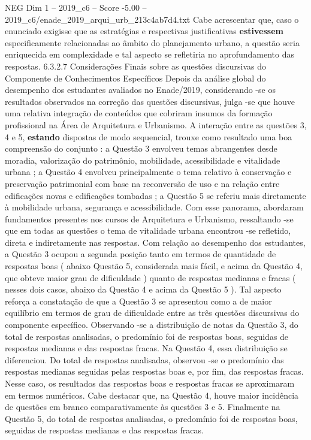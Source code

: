 \begin{textsample}{NEG Dim 1 – 2019\_c6 – Score -5.00 – 2019\_c6/enade\_2019\_arqui\_urb\_213c4ab7d4.txt}
Cabe acrescentar que, caso o enunciado exigisse que as estratégias e respectivas justificativas \textbf{estivessem} especificamente relacionadas ao âmbito do planejamento urbano, a questão seria enriquecida em complexidade e tal aspecto se refletiria no aprofundamento das respostas. 6.3.2.7 Considerações Finais sobre as questões discursivas do Componente de Conhecimentos Específicos Depois da análise global do desempenho dos estudantes avaliados no Enade/2019, considerando -se os resultados observados na correção das questões discursivas, julga -se que houve uma relativa integração de conteúdos que cobriram insumos da formação profissional na Área de Arquitetura e Urbanismo.
A interação entre as questões 3, 4 e 5, \textbf{estando} dispostas de modo sequencial, trouxe como resultado uma boa compreensão do conjunto : a Questão 3 envolveu temas abrangentes desde moradia, valorização do patrimônio, mobilidade, acessibilidade e vitalidade urbana ; a Questão 4 envolveu principalmente o tema relativo à conservação e preservação patrimonial com base na reconversão de uso e na relação entre edificações novas e edificações tombadas ; a Questão 5 se referiu mais diretamente à mobilidade urbana, segurança e acessibilidade.
Com esse panorama, abordaram fundamentos presentes nos cursos de Arquitetura e Urbanismo, ressaltando -se que em todas as questões o tema de vitalidade urbana encontrou -se refletido, direta e indiretamente nas respostas.
Com relação ao desempenho dos estudantes, a Questão 3 ocupou a segunda posição tanto em termos de quantidade de respostas boas ( abaixo Questão 5, considerada mais fácil, e acima da Questão 4, que obteve maior grau de dificuldade ) quanto de respostas medianas e fracas ( nesses dois casos, abaixo da Questão 4 e acima da Questão 5 ).
Tal aspecto reforça a constatação de que a Questão 3 se apresentou como a de maior equilíbrio em termos de grau de dificuldade entre as três questões discursivas do componente específico.
Observando -se a distribuição de notas da Questão 3, do total de respostas analisadas, o predomínio foi de respostas boas, seguidas de respostas medianas e das respostas fracas.
Na Questão 4, essa distribuição se diferenciou.
Do total de respostas analisadas, observou -se o predomínio das respostas medianas seguidas pelas respostas boas e, por fim, das respostas fracas.
Nesse caso, os resultados das respostas boas e respostas fracas se aproximaram em termos numéricos.
Cabe destacar que, na Questão 4, houve maior incidência de questões em branco comparativamente às questões 3 e 5.
Finalmente na Questão 5, do total de respostas analisadas, o predomínio foi de respostas boas, seguidas de respostas medianas e das respostas fracas.

\end{textsample}
